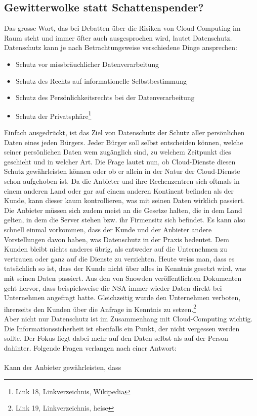 \subsection{Gewitterwolke statt Schattenspender?}
Das grosse Wort, das bei Debatten über die Risiken von Cloud Computing im Raum steht und immer öfter auch ausgesprochen wird, lautet Datenschutz. Datenschutz kann je nach Betrachtungsweise verschiedene Dinge ansprechen:

\begin{itemize}
\item Schutz vor missbräuchlicher Datenverarbeitung
\item Schutz des Rechts auf informationelle Selbstbestimmung
\item Schutz des Persönlichkeitsrechts bei der Datenverarbeitung
\item Schutz der Privatsphäre\footnote{Link 18, Linkverzeichnis, Wikipedia}
\end{itemize}

Einfach ausgedrückt, ist das Ziel von Datenschutz der Schutz aller persönlichen Daten eines jeden Bürgers. Jeder Bürger soll selbst entscheiden können, welche seiner persönlichen Daten wem zugänglich sind, zu welchem Zeitpunkt dies geschieht und in welcher Art. Die Frage lautet nun, ob Cloud-Dienste diesen Schutz gewährleisten können oder ob er allein in der Natur der Cloud-Dienste schon aufgehoben ist. Da die Anbieter und ihre Rechenzentren sich oftmals in einem anderen Land oder gar auf einem anderen Kontinent befinden als der Kunde, kann dieser kaum kontrollieren, was mit seinen Daten wirklich passiert. Die Anbieter müssen sich zudem meist an die Gesetze halten, die in dem Land gelten, in dem die Server stehen bzw. ihr Firmensitz sich befindet. Es kann also schnell einmal vorkommen, dass der Kunde und der Anbieter  andere Vorstellungen davon haben, was Datenschutz in der Praxis bedeutet. Dem Kunden bleibt nichts anderes übrig, als entweder auf die Unternehmen zu vertrauen oder ganz auf die Dienste zu verzichten. Heute weiss man, dass es tatsächlich so ist, dass der Kunde nicht über alles in Kenntnis gesetzt wird, was mit seinen Daten passiert. Aus den von Snowden veröffentlichten Dokumenten geht hervor, dass beispielsweise die NSA  immer wieder Daten direkt bei Unternehmen angefragt hatte. Gleichzeitig wurde den Unternehmen verboten, ihrerseits den Kunden über die Anfrage in Kenntnis zu setzen.\footnote{Link 19, Linkverzeichnis, heise}
\\
Aber nicht nur Datenschutz ist im Zusammenhang mit Cloud-Computing wichtig. Die Informationssicherheit ist ebenfalls ein Punkt, der nicht vergessen werden sollte. Der Fokus liegt dabei mehr auf den Daten selbst als auf der Person dahinter. Folgende Fragen verlangen nach einer Antwort:
\\
\\
Kann der Anbieter gewährleisten, dass

